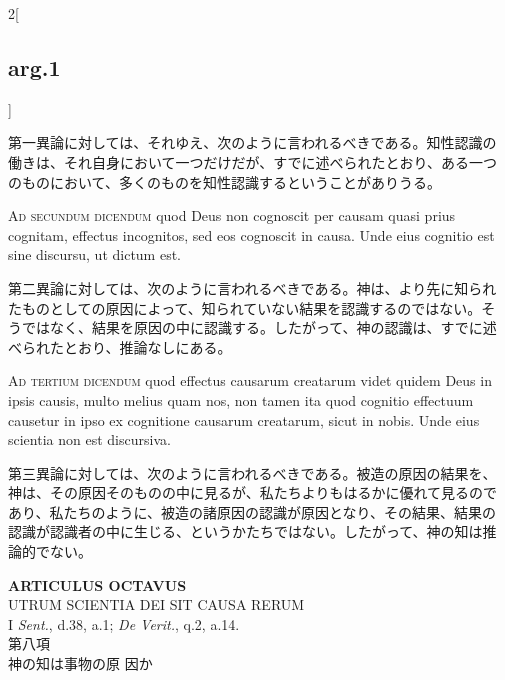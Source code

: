 \documentclass[paper=a4paper,fontsize=10pt,jafontsize=9pt,titlepage]{jlreq}
\begin{document}
\begin{paracol}{2}[\subsection{arg.1}]
\switchcolumn

第一異論に対しては、それゆえ、次のように言われるべきである。知性認識の
働きは、それ自身において一つだけだが、すでに述べられたとおり、ある一つ
のものにおいて、多くのものを知性認識するということがありうる。

\switchcolumn*[\subsection{ad.2}]

{\scshape Ad secundum dicendum} quod Deus non cognoscit per causam
quasi prius cognitam, effectus incognitos, sed eos cognoscit in
causa. Unde eius cognitio est sine discursu, ut dictum est.

\switchcolumn

第二異論に対しては、次のように言われるべきである。神は、より先に知られ
たものとしての原因によって、知られていない結果を認識するのではない。そ
うではなく、結果を原因の中に認識する。したがって、神の認識は、すでに述
べられたとおり、推論なしにある。

\switchcolumn*[\subsection{ad.3}]

{\scshape Ad tertium dicendum} quod effectus causarum creatarum videt
quidem Deus in ipsis causis, multo melius quam nos, non tamen ita quod
cognitio effectuum causetur in ipso ex cognitione causarum creatarum,
sicut in nobis. Unde eius scientia non est discursiva.

\switchcolumn

第三異論に対しては、次のように言われるべきである。被造の原因の結果を、
神は、その原因そのものの中に見るが、私たちよりもはるかに優れて見るので
あり、私たちのように、被造の諸原因の認識が原因となり、その結果、結果の
認識が認識者の中に生じる、というかたちではない。したがって、神の知は推
論的でない。

\end{paracol}


\newpage




{}
\setcounter{section}{8}
\setcounter{subsection}{0}
\begin{center}
{\Large {\bfseries ARTICULUS OCTAVUS}}\\ {\large UTRUM SCIENTIA DEI SIT
CAUSA RERUM}\\ {\footnotesize I {\itshape Sent.}, d.38, a.1;
{\itshape De Verit.}, q.2, a.14.}\\ {\Large 第八項\\神の知は事物の原
因か}
\end{center}
\end{document}

